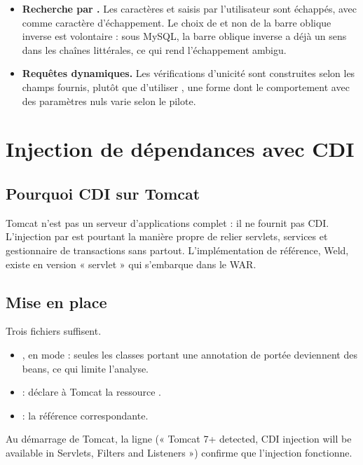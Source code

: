 \begin{itemize}
  \item \textbf{Recherche par .} Les caractères \code{\%} et \code{\_} saisis par l'utilisateur sont
        échappés, avec \code{!} comme caractère d'échappement. Le choix de \code{!} et non de la barre oblique inverse est
        volontaire : sous MySQL, la barre oblique inverse a déjà un sens dans les chaînes littérales, ce qui rend
        l'échappement ambigu.
  \item \textbf{Requêtes dynamiques.} Les vérifications d'unicité sont construites selon les champs fournis, plutôt que
        d'utiliser , une forme dont le comportement avec des paramètres nuls varie selon le pilote.
\end{itemize}

\section{Injection de dépendances avec CDI}
\subsection{Pourquoi CDI sur Tomcat}
Tomcat n'est pas un serveur d'applications complet : il ne fournit pas CDI. L'injection par  est
pourtant la manière propre de relier servlets, services et gestionnaire de transactions sans  partout. L'implémentation
de référence, Weld, existe en version « servlet » qui s'embarque dans le WAR.

\subsection{Mise en place}
Trois fichiers suffisent.
\begin{itemize}
  \item {}, en mode  : seules les classes portant une annotation de portée
        deviennent des beans, ce qui limite l'analyse.
  \item {} : déclare à Tomcat la ressource .
  \item {} : la référence  correspondante.
\end{itemize}
Au démarrage de Tomcat, la ligne  (« Tomcat 7+ detected, CDI injection will be available in Servlets,
Filters and Listeners ») confirme que l'injection fonctionne.

